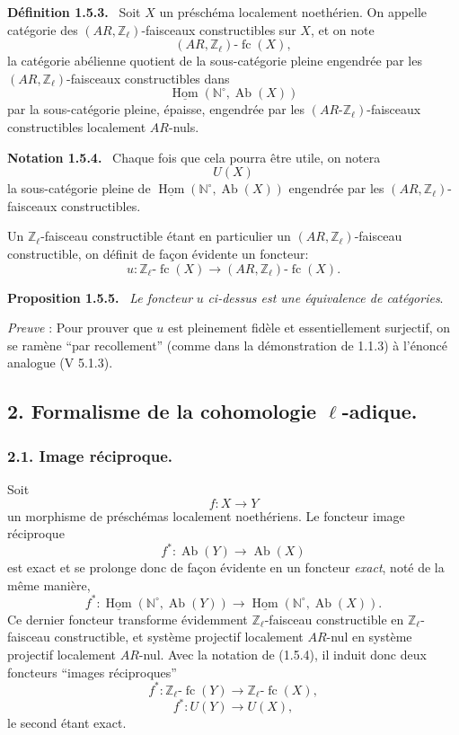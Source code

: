 \documentclass[11pt]{article}
\newenvironment{statement}[1]{\par\medskip\noindent\textbf{#1.}\ }{\par\medskip}
\DeclareMathOperator{\Hom}{Hom}
\providecommand{\uHom}{\underline{\Hom}}
\providecommand{\Hom}{\operatorname{Hom}}
\providecommand{\Ab}{\operatorname{Ab}}
\providecommand{\fc}{\operatorname{fc}}
\providecommand{\Ab}{\operatorname{Ab}}
\providecommand{\Hom}{\operatorname{Hom}}
\begin{document}
\begin{statement}{Définition 1.5.3}
Soit \(X\) un préschéma localement noethérien. On appelle catégorie des \((AR,\mathbb Z_\ell)\)-faisceaux constructibles sur \(X\), et on note
\[
(AR,\mathbb Z_\ell)\text{-}\fc(X),
\]
la
catégorie abélienne quotient de la sous-catégorie pleine engendrée par les \((AR,\mathbb Z_\ell)\)-faisceaux constructibles dans
\[
\uHom(\mathbb N^\circ,\Ab(X))
\]
par la sous-catégorie pleine, épaisse, engendrée par les \((AR\text{-}\mathbb Z_\ell)\)-faisceaux constructibles localement \(AR\)-nuls.
\end{statement}

\begin{statement}{Notation 1.5.4}
Chaque fois que cela pourra être utile, on notera
\[
U(X)
\]
la sous-catégorie pleine de \(\uHom(\mathbb N^\circ,\Ab(X))\) engendrée par les \((AR,\mathbb Z_\ell)\)-faisceaux constructibles.
\end{statement}

Un \(\mathbb Z_\ell\)-faisceau constructible étant en particulier un \((AR,\mathbb Z_\ell)\)-faisceau constructible, on définit de façon évidente un foncteur:
\[
u:\mathbb Z_\ell\text{-}\fc(X)\longrightarrow (AR,\mathbb Z_\ell)\text{-}\fc(X).
\]

\begin{statement}{Proposition 1.5.5}
\emph{Le foncteur} \(u\) \emph{ci-dessus est une équivalence de catégories}.
\end{statement}

\emph{Preuve} : Pour prouver que \(u\) est pleinement fidèle et essentiellement surjectif, on se ramène ``par recollement'' (comme dans la démonstration de 1.1.3) à l'énoncé analogue (V 5.1.3).

\subsection*{2. Formalisme de la cohomologie \(\ell\)-adique.}

\subsubsection*{2.1. Image réciproque.}

Soit
\[
f:X\longrightarrow Y
\]
un morphisme de préschémas localement noethériens. Le foncteur image réciproque
\[
f^*:\Ab(Y)\longrightarrow \Ab(X)
\]
est exact et se prolonge donc de façon évidente en un foncteur \emph{exact}, noté de la même manière,
\[
f^*:\uHom(\mathbb N^\circ,\Ab(Y))\longrightarrow \uHom(\mathbb N^\circ,\Ab(X)).
\]
Ce dernier foncteur transforme évidemment \(\mathbb Z_\ell\)-faisceau constructible en \(\mathbb Z_\ell\)-faisceau constructible, et système projectif localement \(AR\)-nul en système projectif localement \(AR\)-nul. Avec la notation de (1.5.4), il induit donc deux foncteurs ``images réciproques''
\[
f^*:\mathbb Z_\ell\text{-}\fc(Y)\longrightarrow \mathbb Z_\ell\text{-}\fc(X),
\]
\[
f^*:U(Y)\longrightarrow U(X),
\]
le second étant exact.
\end{document}
